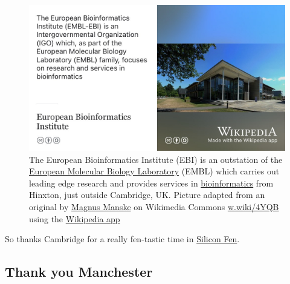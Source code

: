 \documentclass[
]{book}
\begin{document}
\begin{figure}

{\centering \includegraphics[width=1\linewidth]{images/european-bioinformatics-institute} 

}

\caption{The European Bioinformatics Institute (EBI) is an outstation of the \href{https://en.wikipedia.org/wiki/European_Molecular_Biology_Laboratory}{European Molecular Biology Laboratory} (EMBL) which carries out leading edge research and provides services in \href{https://en.wikipedia.org/wiki/Bioinformatics}{bioinformatics} from Hinxton, just outside Cambridge, UK. Picture adapted from an original by \href{https://en.wikipedia.org/wiki/Magnus_Manske}{Magnus Manske} on Wikimedia Commons \href{https://w.wiki/4YQB}{w.wiki/4YQB} using the \href{https://apps.apple.com/us/app/wikipedia/id324715238}{Wikipedia app}}\label{fig:cambridge-fig}
\end{figure}



So thanks Cambridge for a really fen-tastic time in \href{https://en.wikipedia.org/wiki/Silicon_Fen}{Silicon Fen}. 🙏

\hypertarget{manchester}{%
\subsection{Thank you Manchester}\label{manchester}}
\end{document}
